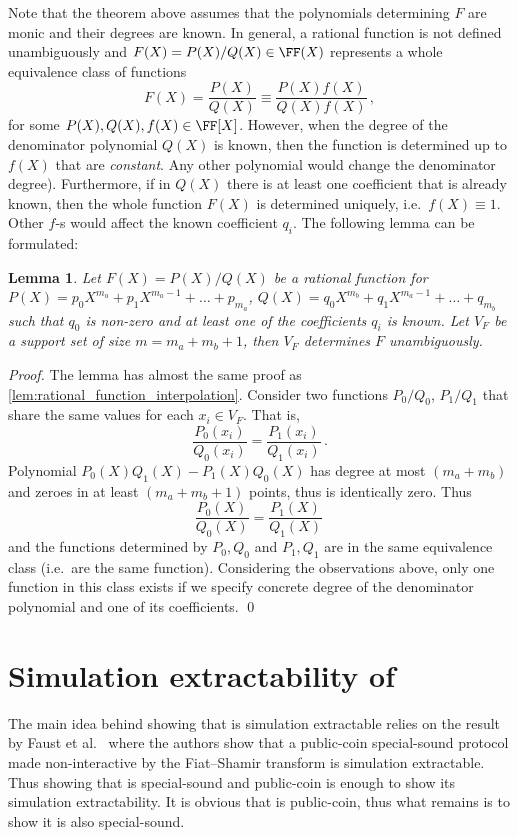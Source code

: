 \documentclass[runningheads]{llncs}
\newtheorem{lemma}[theorem]{Lemma}
\theoremstyle{definition}
\begin{document}
Note that the theorem above assumes that the polynomials determining $F$ are monic and their degrees are known. In general, a rational function is not defined unambiguously and $F(X) = P(X) / Q(X) \in \FF(X)$ represents a whole equivalence class of functions 
\[
	F(X) = \frac{P(X)}{Q(X)} \equiv \frac{P(X) f(X)}{Q(X) f(X)}\,,
\]
for some $P(X), Q(X), f(X) \in \FF[X]$.
However, when the degree of the denominator polynomial $Q(X)$ is known, then the function is determined up to $f(X)$ that are \emph{constant}. Any other polynomial would change the denominator degree). 
Furthermore, if in $Q(X)$ there is at least one coefficient that is already known, then the whole function $F(X)$ is determined uniquely, i.e.~$f(X) \equiv 1$. Other $f$-s would affect the known coefficient $q_i$. 
The following lemma can be formulated:
\begin{lemma}
	\label{lem:rational_function_interpolation_2}
	Let $F(X) = P(X) / Q(X)$ be a rational function for $P(X) = p_0 X^{m_a} + p_1 X^{m_a - 1} + \ldots + p_{m_a}$, $Q(X) = q_0 X^{m_b} + q_1 X^{m_a - 1} + \ldots + q_{m_b}$ such that $q_0$ is non-zero and at least one of the coefficients $q_i$ is known.
	Let $V_F$ be a support set of size $m = m_a + m_b + 1$, then $V_F$ determines $F$ unambiguously. 
\end{lemma}
\begin{proof}
	The lemma has almost the same proof as \cref{lem:rational_function_interpolation}. Consider two functions $P_0 / Q_0$, $P_1 / Q_1$ that share the same values for each $x_i \in V_F$. That is,
	\[
		\frac{P_0(x_i)}{Q_0(x_i)} = \frac{P_1(x_i)}{Q_1(x_i)}\,.
	\]
	Polynomial $P_0(X) Q_1(X) - P_1(X) Q_0(X)$ has degree at most $(m_a + m_b)$ and zeroes in at least $(m_a + m_b + 1)$ points, thus is identically zero. Thus
	\[
		\frac{P_0(X)}{Q_0(X)} = \frac{P_1(X)}{Q_1(X)}\,
	\]
	and the functions determined by $P_0, Q_0$ and $P_1, Q_1$ are in the same equivalence class (i.e.~are the same function). Considering the observations above, only one function in this class exists if we specify concrete degree of the denominator polynomial and one of its coefficients.
	\qed
\end{proof}

\section{Simulation extractability of \plonk [OLD]}
The main idea behind showing that \plonk{} is simulation extractable relies on the result by Faust et al.~\cite{INDOCRYPT:FKMV12} where the authors show that a public-coin special-sound protocol made non-interactive by the Fiat--Shamir transform is simulation extractable.
Thus showing that \plonk{} is special-sound and public-coin is enough to show its simulation extractability. It is obvious that \plonk{} is public-coin, thus what remains is to show it is also special-sound.
\end{document}

